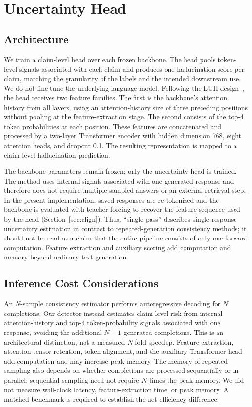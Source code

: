 \documentclass[conference,a4paper]{IEEEtran}
\begin{document}
\section{Uncertainty Head}

\subsection{Architecture}

We train a claim-level head over each frozen backbone. The head pools token-level signals associated with each claim and produces one hallucination score per claim, matching the granularity of the labels and the intended downstream use. We do not fine-tune the underlying language model.
Following the LUH design~\cite{b1}, the head receives two feature families. The first is the backbone's attention history from all layers, using an attention-history size of three preceding positions without pooling at the feature-extraction stage. The second consists of the top-4 token probabilities at each position. These features are concatenated and processed by a two-layer Transformer encoder with hidden dimension 768, eight attention heads, and dropout 0.1. The resulting representation is mapped to a claim-level hallucination prediction.

The backbone parameters remain frozen; only the uncertainty head is trained. The method uses internal signals associated with one generated response and therefore does not require multiple sampled answers or an external retrieval step. In the present implementation, saved responses are re-tokenized and the backbone is evaluated with teacher forcing to recover the feature sequence used by the head (Section~\ref{sec:align}). Thus, ``single-pass'' describes single-response uncertainty estimation in contrast to repeated-generation consistency methods; it should not be read as a claim that the entire pipeline consists of only one forward computation. Feature extraction and auxiliary scoring add computation and memory beyond ordinary text generation.

\subsection{Inference Cost Considerations}

An $N$-sample consistency estimator performs autoregressive decoding for $N$ completions. Our detector instead estimates claim-level risk from internal attention-history and top-4 token-probability signals associated with one response, avoiding the additional $N-1$ generated completions. This is an architectural distinction, not a measured $N$-fold speedup. Feature extraction, attention-tensor retention, token alignment, and the auxiliary Transformer head add computation and may increase peak memory. The memory of repeated sampling also depends on whether completions are processed sequentially or in parallel; sequential sampling need not require $N$ times the peak memory. We did not measure wall-clock latency, feature-extraction time, or peak memory. A matched benchmark is required to establish the net efficiency difference.
\end{document}
